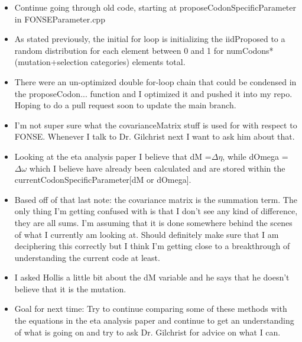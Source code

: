 \documentclass[letterpaper,index=totoc,hyperref,openany]{labbook} %
\begin{document}

\begin{itemize}
	\item Continue going through old code, starting at proposeCodonSpecificParameter in FONSEParameter.cpp
\end{itemize}

\begin{itemize}
	\item As stated previously, the initial for loop is initializing the iidProposed to a random distribution for each element between 0 and 1 for numCodons*(mutation+selection categories) elements total.
	\item There were an un-optimized double for-loop chain that could be condensed in the proposeCodon... function and I optimized it and pushed it into my repo. Hoping to do a pull request soon to update the main branch.
	\item I'm not super sure what the covarianceMatrix stuff is used for with respect to FONSE. Whenever I talk to Dr. Gilchrist next I want to ask him about that.
	\item Looking at the eta analysis paper I believe that dM =\begin{math} \Delta \eta \end{math}, while dOmega = \begin{math}\Delta \omega \end{math} which I believe have already been calculated and are stored within the currentCodonSpecificParameter[dM or dOmega].
	\item Based off of that last note: the covariance matrix is the summation term. The only thing I'm getting confused with is that I don't see any kind of difference, they are all sums. I'm assuming that it is done somewhere behind the scenes of what I currently am looking at. Should definitely make sure that I am deciphering this correctly but I think I'm getting close to a breakthrough of understanding the current code at least.
	\item I asked Hollis a little bit about the dM variable and he says that he doesn't believe that it is the mutation.
	\item Goal for next time: Try to continue comparing some of these methods with the equations in the eta analysis paper and continue to get an understanding of what is going on and try to ask Dr. Gilchrist for advice on what I can.
\end{itemize}
\end{document}
